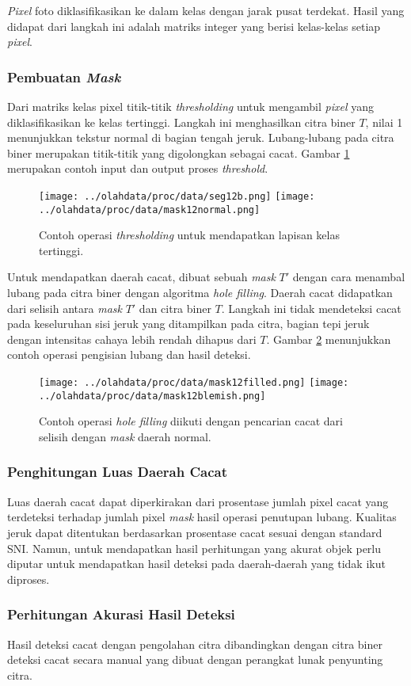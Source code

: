 \documentclass[laporan.tex]{subfiles}
\begin{document}
\emph{Pixel} foto diklasifikasikan ke dalam kelas dengan jarak pusat terdekat. Hasil yang didapat dari langkah ini adalah matriks integer yang berisi kelas-kelas setiap \emph{pixel}.

\subsubsection{Pembuatan \emph{Mask}}

Dari matriks kelas pixel titik-titik \emph{thresholding} untuk mengambil \emph{pixel} yang diklasifikasikan ke kelas tertinggi. Langkah ini menghasilkan citra biner $T$, nilai 1 menunjukkan tekstur normal di bagian tengah jeruk. Lubang-lubang pada citra biner merupakan titik-titik yang digolongkan sebagai cacat. Gambar \ref{fig:highmask} merupakan contoh input dan output proses \emph{threshold}.

\begin{figure}[h]
\centering
\texttt{[image: ../olahdata/proc/data/seg12b.png]} \qquad
\texttt{[image: ../olahdata/proc/data/mask12normal.png]}
\caption{Contoh operasi \emph{thresholding} untuk mendapatkan lapisan kelas tertinggi.}
\label{fig:highmask}
\end{figure}

Untuk mendapatkan daerah cacat, dibuat sebuah \emph{mask} $T'$ dengan cara menambal lubang pada citra biner dengan algoritma \emph{hole filling}. Daerah cacat didapatkan dari selisih antara \emph{mask} $T'$ dan citra biner $T$. Langkah ini tidak mendeteksi cacat pada keseluruhan sisi jeruk yang ditampilkan pada citra, bagian tepi jeruk dengan intensitas cahaya lebih rendah dihapus dari $T$. Gambar \ref{fig:holemask} menunjukkan contoh operasi pengisian lubang dan hasil deteksi.

\begin{figure}[h]
\centering
\texttt{[image: ../olahdata/proc/data/mask12filled.png]} \qquad
\texttt{[image: ../olahdata/proc/data/mask12blemish.png]}
\caption{Contoh operasi \emph{hole filling} diikuti dengan pencarian cacat dari selisih dengan \emph{mask} daerah normal.}
\label{fig:holemask}
\end{figure}

\subsubsection{Penghitungan Luas Daerah Cacat}

Luas daerah cacat dapat diperkirakan dari prosentase jumlah pixel cacat yang terdeteksi terhadap jumlah pixel \emph{mask} hasil operasi penutupan lubang. Kualitas jeruk dapat ditentukan berdasarkan prosentase cacat sesuai dengan standard SNI. Namun, untuk mendapatkan hasil perhitungan yang akurat objek perlu diputar untuk mendapatkan hasil deteksi pada daerah-daerah yang tidak ikut diproses.

\subsubsection{Perhitungan Akurasi Hasil Deteksi}

Hasil deteksi cacat dengan pengolahan citra dibandingkan dengan citra biner deteksi cacat secara manual yang dibuat dengan perangkat lunak penyunting citra.
\end{document}
